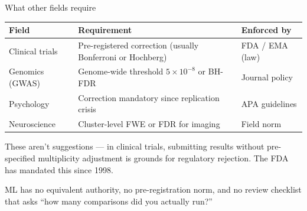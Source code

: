 \documentclass[aspectratio=169,11pt]{beamer}
\begin{document}
\begin{frame}{What other fields require}

\vspace{0.3em}

{\small
\begin{tabular}{lp{5.5cm}l}
\toprule
\textbf{Field} & \textbf{Requirement} & \textbf{Enforced by} \\
\midrule
Clinical trials & Pre-registered correction (usually Bonferroni or Hochberg) & FDA / EMA (law) \\[4pt]
Genomics (GWAS) & Genome-wide threshold $5 \times 10^{-8}$ or BH-FDR & Journal policy \\[4pt]
Psychology & Correction mandatory since replication crisis & APA guidelines \\[4pt]
Neuroscience & Cluster-level FWE or FDR for imaging & Field norm \\[4pt]
\bottomrule
\end{tabular}
}

\vspace{0.8em}

{\small These aren't suggestions --- in clinical trials, submitting results without pre-specified multiplicity adjustment is grounds for regulatory rejection. The FDA has mandated this since 1998.}

\vspace{0.5em}

{\small ML has no equivalent authority, no pre-registration norm, and no review checklist that asks ``how many comparisons did you actually run?''}
\end{frame}
\end{document}
